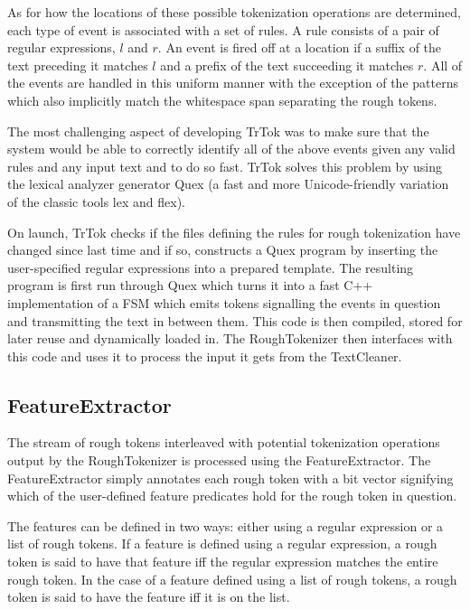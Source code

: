As for how the locations of these possible tokenization operations are
determined, each type of event is associated with a set of rules. A
rule consists of a pair of regular expressions, $l$ and $r$. An event
is fired off at a location if a suffix of the text preceding it
matches $l$ and a prefix of the text succeeding it matches $r$. All of
the events are handled in this uniform manner with the exception of
the \mayjoin{} patterns which also implicitly match the whitespace
span separating the rough tokens.

The most challenging aspect of developing TrTok was to make sure that
the system would be able to correctly identify all of the above events
given any valid rules and any input text and to do so fast. TrTok
solves this problem by using the lexical analyzer generator Quex (a
fast and more Unicode-friendly variation of the classic tools lex and
flex).

On launch, TrTok checks if the files defining the rules for rough
tokenization have changed since last time and if so, constructs a Quex
program by inserting the user-specified regular expressions into a
prepared template. The resulting program is first run through Quex
which turns it into a fast C++ implementation of a FSM which emits
tokens signalling the events in question and transmitting the text in
between them. This code is then compiled, stored for later reuse and
dynamically loaded in. The RoughTokenizer then interfaces with this
code and uses it to process the input it gets from the TextCleaner.

\subsection{FeatureExtractor}

The stream of rough tokens interleaved with potential tokenization
operations output by the RoughTokenizer is processed using the
FeatureExtractor. The FeatureExtractor simply annotates each rough
token with a bit vector signifying which of the user-defined feature
predicates hold for the rough token in question.

The features can be defined in two ways: either using a regular
expression or a list of rough tokens. If a feature is defined using a
regular expression, a rough token is said to have that feature iff the
regular expression matches the entire rough token. In the case of a
feature defined using a list of rough tokens, a rough token is said to
have the feature iff it is on the list.

